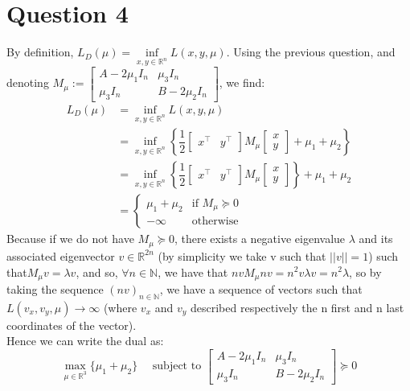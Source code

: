 \documentclass{article}
\newcommand{\R}{\mathbb{R}}
\newcommand{\N}{\mathbb{N}}
\newcommand{\tp}{^\top}
\begin{document}
\section*{Question 4}
By definition, $L_D(\mu)=\inf\limits_{x,y\in\R^n} L(x,y,\mu)$. Using the previous question, and denoting $M_\mu:=\begin{bmatrix} A-2\mu_1 I_n & \mu_3 I_n \\
\mu_3 I_n & B-2\mu_2 I_n \end{bmatrix}$, we find:
\begin{align*}
L_D(\mu)&=\inf\limits_{x,y\in\R^n} L(x,y,\mu) \\
&=\inf\limits_{x,y\in\R^n} \left\lbrace \dfrac{1}{2} \begin{bmatrix} x\tp & y\tp\end{bmatrix}M_\mu\begin{bmatrix} x \\ y \end{bmatrix} +\mu_1+\mu_2 \right\rbrace \\
&=\inf\limits_{x,y\in\R^n} \left\lbrace \dfrac{1}{2} \begin{bmatrix} x\tp & y\tp\end{bmatrix}M_\mu\begin{bmatrix} x \\ y \end{bmatrix} \right\rbrace+\mu_1+\mu_2   \\
&=\begin{cases} \mu_1+\mu_2 &\text{if }M_\mu\succeq 0 \\ -\infty &\text{otherwise} \end{cases}
\end{align*}
Because if we do not have $M_\mu\succeq 0 $, there exists a negative eigenvalue $\lambda$ and its associated eigenvector $v \in \R^{2n}$ (by simplicity we take v such that $||v||=1$) such that$ M_\mu v=\lambda v$, and so, $\forall n \in \N$, we have that $nv M_\mu nv=n^2 v \lambda v=n^2 \lambda$, so by taking the sequence $(nv)_{n \in \N}$, we have a sequence of vectors such that $L(v_x,v_y,\mu) \to \infty$ (where $v_x$ and $v_y$ described respectively the n first and n last coordinates of the vector).\\
Hence we can write the dual as:
\begin{equation*}\tag{D} \label{D}
\max_{\mu\in\R^3} \{\mu_1+\mu_2\} \quad \text{ subject to } \begin{bmatrix} A-2\mu_1 I_n & \mu_3 I_n \\
\mu_3 I_n & B-2\mu_2 I_n \end{bmatrix} \succeq 0
\end{equation*}
\end{document}
